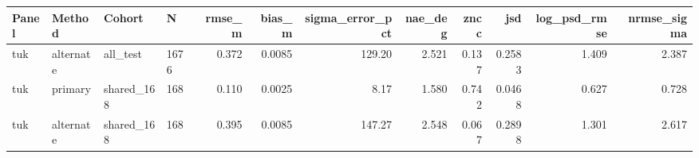 \begin{tabular}{llllrrrrrrrr}
\hline
Panel & Method & Cohort & N & rmse\_m & bias\_m & sigma\_error\_pct & nae\_deg & zncc & jsd & log\_psd\_rmse & nrmse\_sigma \\
\hline
tuk & alternate & all\_test & 1676 & 0.372 & 0.0085 & 129.20 & 2.521 & 0.137 & 0.2583 & 1.409 & 2.387 \\
tuk & primary & shared\_168 & 168 & 0.110 & 0.0025 & 8.17 & 1.580 & 0.742 & 0.0468 & 0.627 & 0.728 \\
tuk & alternate & shared\_168 & 168 & 0.395 & 0.0085 & 147.27 & 2.548 & 0.067 & 0.2898 & 1.301 & 2.617 \\
\hline
\end{tabular}

